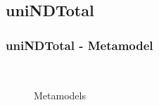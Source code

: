 \documentclass{beamer}
\begin{document}
\subsection{uniNDTotal}

\begin{frame}
\frametitle{\textbf{uniNDTotal} - \textbf{Metamodel}}

\begin{figure}[ht]
    \centering
    \mbox{\qquad\qquad
          }
    \caption{Metamodels}
    \label{fig:Meta}
\end{figure}

\end{frame}
\end{document}
